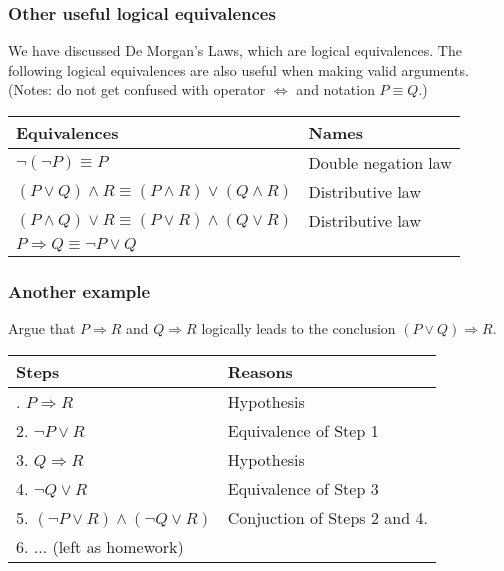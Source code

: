 \begin{frame}\frametitle{Other useful logical equivalences}
  We have discussed De Morgan's Laws, which are logical
  equivalences. The following logical equivalences are also useful
  when making valid arguments.  (Notes: do not get confused with
  operator $\Leftrightarrow$ and notation $P\equiv Q$.)

  \vspace{0.2in}
  
  \begin{tabular}{l|l}
    Equivalences & Names \\
    \hline
    $\neg (\neg P)\equiv P$ & Double negation law \\
    $(P\vee Q)\wedge R\equiv (P\wedge R)\vee(Q\wedge R)$ & Distributive law\\
    $(P\wedge Q)\vee R\equiv (P\vee R)\wedge(Q\vee R)$ & Distributive law\\
    $P\Rightarrow Q\equiv \neg P\vee Q$ & \\
  \end{tabular}
\end{frame}

\begin{frame}\frametitle{Another example}
  \begin{tcolorbox}
    Argue that $P\Rightarrow R$ and $Q\Rightarrow R$ logically leads
    to the conclusion $(P\vee Q)\Rightarrow R$.
  \end{tcolorbox}
  \pause
  \begin{tabular}{ll}
    {\bf Steps} & {\bf Reasons}\\
    \hline\pause
    1. $P\Rightarrow R$ & Hypothesis\pause \\
    2. $\neg P\vee R$ & Equivalence of Step 1\pause \\
    3. $Q\Rightarrow R$ & Hypothesis\pause \\
    4. $\neg Q\vee R$ & Equivalence of Step 3\pause \\
    5. $(\neg P\vee R)\wedge (\neg Q\vee R)$ & Conjuction of Steps 2 and 4.\pause \\
    6. ... (left as homework)
  \end{tabular}
\end{frame}
